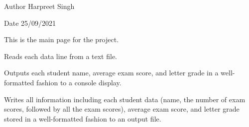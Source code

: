 \begin{DoxyAuthor}{Author}
Harpreet Singh 
\end{DoxyAuthor}
\begin{DoxyDate}{Date}
25/09/2021
\end{DoxyDate}
This is the main page for the project.


\begin{DoxyEnumerate}
\item Reads each data line from a text file.
\item Outputs each student name, average exam score, and letter grade in a well-\/formatted fashion to a console display.
\item Writes all information including each student data (name, the number of exam scores, followed by all the exam scores), average exam score, and letter grade stored in a well-\/formatted fashion to an output file. 
\end{DoxyEnumerate}
